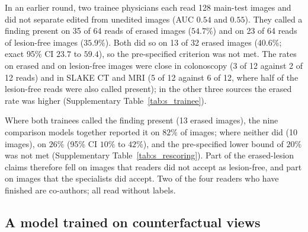 In an earlier round, two trainee physicians each read 128 main-test images and did not separate edited from unedited images (AUC $0.54$ and $0.55$).
They called a finding present on 35 of 64 reads of erased images ($54.7\%$) and on 23 of 64 reads of lesion-free images ($35.9\%$).
Both did so on 13 of 32 erased images ($40.6\%$; exact 95\% CI $23.7$ to $59.4$), so the pre-specified criterion was not met.
The rates on erased and on lesion-free images were close in colonoscopy (3 of 12 against 2 of 12 reads) and in SLAKE CT and MRI (5 of 12 against 6 of 12, where half of the lesion-free reads were also called present); in the other three sources the erased rate was higher (Supplementary Table~\ref{tab:s_trainee}).

Where both trainees called the finding present (13 erased images), the nine comparison models together reported it on $82\%$ of images; where neither did (10 images), on $26\%$ (95\% CI $10\%$ to $42\%$), and the pre-specified lower bound of $20\%$ was not met (Supplementary Table~\ref{tab:s_rescoring}).
Part of the erased-lesion claims therefore fell on images that readers did not accept as lesion-free, and part on images that the specialists did accept.
Two of the four readers who have finished are co-authors; all read without labels.

\subsection{A model trained on counterfactual views}\label{subsec:res_trained}

